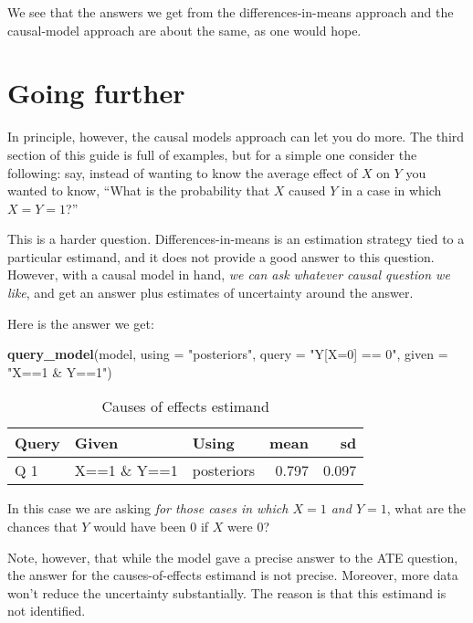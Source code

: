 \documentclass[
  12pt,
]{book}
\newenvironment{Shaded}{\begin{snugshade}}{\end{snugshade}}
\newcommand{\DataTypeTok}[1]{\textcolor[rgb]{0.13,0.29,0.53}{#1}}
\newcommand{\KeywordTok}[1]{\textcolor[rgb]{0.13,0.29,0.53}{\textbf{#1}}}
\newcommand{\NormalTok}[1]{#1}
\newcommand{\StringTok}[1]{\textcolor[rgb]{0.31,0.60,0.02}{#1}}
\begin{document}
We see that the answers we get from the differences-in-means approach and the causal-model approach are about the same, as one would hope.

\hypertarget{going-further}{%
\section{Going further}\label{going-further}}

In principle, however, the causal models approach can let you do more. The third section of this guide is full of examples, but for a simple one consider the following: say, instead of wanting to know the average effect of \(X\) on \(Y\) you wanted to know, ``What is the probability that \(X\) caused \(Y\) in a case in which \(X=Y=1\)?''

This is a harder question. Differences-in-means is an estimation strategy tied to a particular estimand, and it does not provide a good answer to this question. However, with a causal model in hand, \emph{we can ask whatever causal question we like}, and get an answer plus estimates of uncertainty around the answer.

Here is the answer we get:

\begin{Shaded}
\begin{Highlighting}[]
\KeywordTok{query_model}\NormalTok{(model, }
            \DataTypeTok{using =} \StringTok{"posteriors"}\NormalTok{, }
            \DataTypeTok{query =} \StringTok{"Y[X=0] == 0"}\NormalTok{,}
            \DataTypeTok{given =} \StringTok{"X==1 & Y==1"}\NormalTok{)  }
\end{Highlighting}
\end{Shaded}

\begin{table}

\caption{\label{tab:unnamed-chunk-11}Causes of effects estimand}
\centering
\begin{tabular}[t]{l|l|l|r|r}
\hline
Query & Given & Using & mean & sd\\
\hline
Q 1 & X==1 \& Y==1 & posteriors & 0.797 & 0.097\\
\hline
\end{tabular}
\end{table}

In this case we are asking \emph{for those cases in which \(X=1\) and \(Y=1\)}, what are the chances that \(Y\) would have been \(0\) if \(X\) were \(0\)?

Note, however, that while the model gave a precise answer to the ATE question, the answer for the causes-of-effects estimand is not precise. Moreover, more data won't reduce the uncertainty substantially. The reason is that this estimand is not identified.
\end{document}
